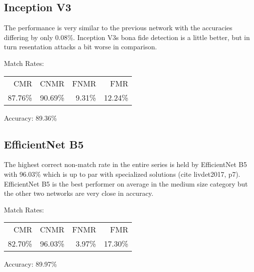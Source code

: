 \medskip\noindent


\bigskip
\subsection{Inception V3}
\begin{minipage}[c]{0.7\textwidth}

    The performance is very similar to the previous network with the accuracies differing by only 0.08\%.
    Inception V3s bona fide detection is a little better, but in turn resentation attacks a bit worse in comparison.

    \medskip\noindent\centering Match Rates: 
    \begin{tabular}{ r  r  r  r |}
        CMR       & CNMR      & FNMR     & FMR     \\
        87.76\%   & 90.69\%   & 9.31\%   & 12.24\%  \\
    \end{tabular} \hspace{2mm} Accuracy: 89.36\%

\end{minipage}
\hfill
\begin{minipage}[c]{0.3\textwidth}

    \centering
    

\end{minipage}



\bigskip
\subsection{EfficientNet B5}

\begin{minipage}[c]{0.7\textwidth}

    The highest correct non-match rate in the entire series is held by EfficientNet B5 with 96.03\% which is up to par with specialized solutions (cite livdet2017, p7).
    EfficientNet B5 is the best performer on average in the medium size category but the other two networks are very close in accuracy.

    \medskip\noindent\centering Match Rates: 
    \begin{tabular}{ r  r  r  r |}
        CMR       & CNMR      & FNMR     & FMR     \\
        82.70\%   & 96.03\%   & 3.97\%   & 17.30\%  \\
    \end{tabular} \hspace{2mm} Accuracy: 89.97\%

\end{minipage}
\hfill
\begin{minipage}[c]{0.3\textwidth}
    \centering
    
\end{minipage}


